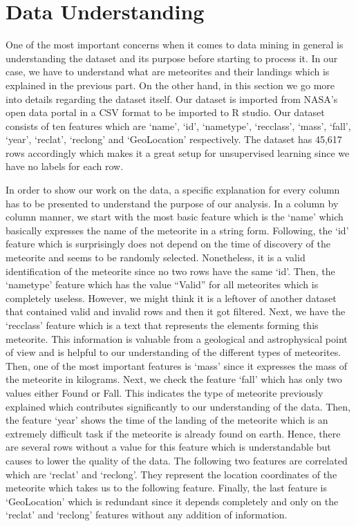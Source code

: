 \section{Data Understanding}
One of the most important concerns when it comes to data mining in general is understanding the dataset and its purpose before starting to process it. In our case, we have to understand what are meteorites and their landings which is explained in the previous part. On the other hand, in this section we go more into details regarding the dataset itself. Our dataset is imported from NASA's open data portal in a CSV format to be imported to R studio. Our dataset consists of ten features which are `name', `id', `nametype', `recclass', `mass', `fall', `year', `reclat', `reclong' and `GeoLocation' respectively. The dataset has 45,617 rows accordingly which makes it a great setup for unsupervised learning since we have no labels for each row. 

In order to show our work on the data, a specific explanation for every column has to be presented to understand the purpose of our analysis. In a column by column manner, we start with the most basic feature which is the `name' which basically expresses the name of the meteorite in a string form. Following, the `id' feature which is surprisingly does not depend on the time of discovery of the meteorite and seems to be randomly selected. Nonetheless, it is a valid identification of the meteorite since no two rows have the same `id'. Then, the `nametype' feature which has the value ``Valid'' for all meteorites which is completely useless. However, we might think it is a leftover of another dataset that contained valid and invalid rows and then it got filtered. Next, we have the `recclass' feature which is a text that represents the elements forming this meteorite. This information is valuable from a geological and astrophysical point of view and is helpful to our understanding of the different types of meteorites. Then, one of the most important features is `mass' since it expresses the mass of the meteorite in kilograms. Next, we check the feature `fall' which has only two values either Found or Fall. This indicates the type of meteorite previously explained which contributes significantly to our understanding of the data. Then, the feature `year' shows the time of the landing of the meteorite which is an extremely difficult task if the meteorite is already found on earth. Hence, there are several rows without a value for this feature which is understandable but causes to lower the quality of the data. The following two features are correlated which are `reclat' and `reclong'. They represent the location coordinates of the meteorite which takes us to the following feature. Finally, the last feature is `GeoLocation' which is redundant since it depends completely and only on the `reclat' and `reclong' features without any addition of information.

